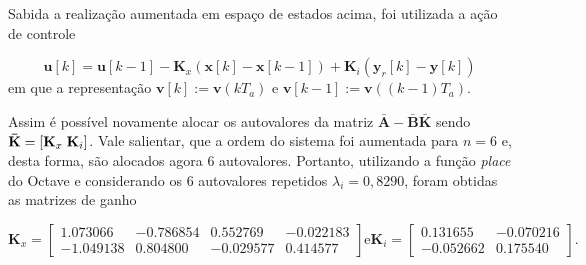 Sabida a realização aumentada em espaço de estados acima, foi
utilizada a ação de controle

\begin{equation}
    \label{eq:acao-de-controle-com-integrador}
    \mathbf{u}[k] = \mathbf{u}[k-1] - \mathbf{K}_x(\mathbf{x}[k]-\mathbf{x}[k-1])+\mathbf{K}_i(\mathbf{y}_r[k]-\mathbf{y}[k])
\end{equation} em que a representação $\mathbf{v}[k] := \mathbf{v}(kT_a)$ e
$\mathbf{v}[k-1] := \mathbf{v}((k-1)T_a)$.

Assim é possível novamente alocar os autovalores da matriz
$\mathbf{\bar{A}}-\mathbf{\bar{B}}\mathbf{\bar{K}}$ sendo $\mathbf{\bar{K}} =
[\mathbf{K}_x \thickspace \mathbf{K}_i]$. Vale salientar, que a ordem do sistema
foi aumentada para $n=6$ e, desta forma, são alocados agora 6 autovalores.
Portanto, utilizando a função \textit{place} do Octave e considerando os 6
autovalores repetidos $\lambda_i = 0,8290$, foram obtidas as matrizes de ganho

\begin{subequations}
    \label{eq:matrizes-de-ganho}
    \begin{equation}
        \label{eq:matriz-de-ganhos-kx}
        \mathbf{K}_x =
        \begin{bmatrix}
            1.073066 & -0.786854 &  0.552769 & -0.022183   \\
            -1.049138 &  0.804800 & -0.029577 &  0.414577
        \end{bmatrix}
    \end{equation}
    \text{e}
    \begin{equation}
        \label{eq:matriz-de-ganhos-ki}
        \mathbf{K}_i =
        \begin{bmatrix}
            0.131655 & -0.070216 \\
            -0.052662 &  0.175540
        \end{bmatrix}\text{.}
    \end{equation}
\end{subequations}

